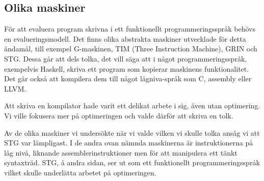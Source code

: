 \documentclass[../Core]{subfiles}
\begin{document}
\subsection{Olika maskiner}
För att evaluera program skrivna i ett funktionellt programmeringsspråk
behövs en evalueringsmodell. Det finns olika abstrakta maskiner utvecklade för
detta ändamål, till exempel G-maskinen, TIM (Three Instruction Machine), GRIN och STG.
Dessa går att dels tolka, det vill säga att i något programmeringsspråk, exempelvis
Haskell, skriva ett program som kopierar maskinens funktionalitet. Det går också att
kompilera dem till något lågniva-språk som C, assembly eller LLVM.

Att skriva en kompilator hade varit ett delikat arbete i sig, även utan
optimering. Vi ville fokusera mer på optimeringen och valde därför att skriva en tolk.

Av de olika maskiner vi undersökte när vi valde vilken vi skulle tolka
ansåg vi att STG var lämpligast. I de andra ovan nämnda maskinerna är
instruktionerna på låg nivå, liknande assemblerinstruktioner men för att manipulera
ett tänkt syntaxträd. STG, å andra sidan, ser ut som ett funktionellt
programmeringsspråk vilket skulle underlätta arbetet på optimeringen.
\end{document}
